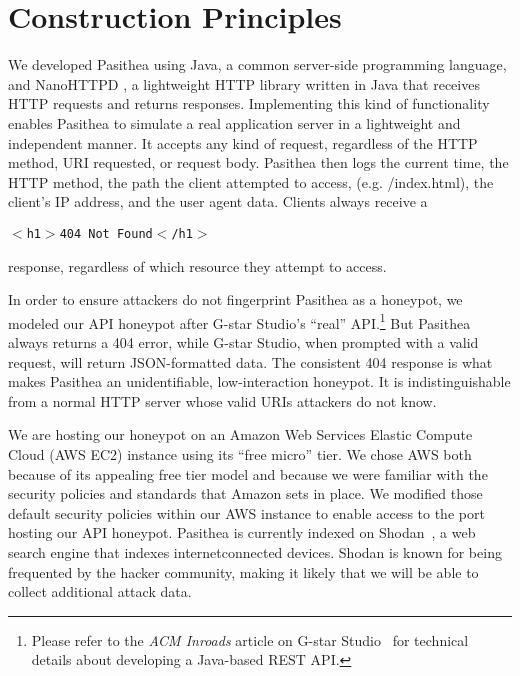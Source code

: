 
\section{Construction Principles} \label{construction}

We developed Pasithea using Java, a common server-side programming language, and NanoHTTPD \cite{Nanohttpd}, a lightweight HTTP library written in Java that receives HTTP requests and returns responses.
Implementing this kind of functionality enables Pasithea to simulate a real application server in a lightweight and independent manner. 
It accepts any kind of request, regardless of the HTTP method, URI requested, or request body. 
Pasithea then logs the current time, the HTTP method, the path the client attempted to access, (e.g. /index.html), the client's IP address, and the user agent data. 
Clients always receive a
 

\begin{center}  %
\texttt{$<$h1$>$404 Not Found$<$/h1$>$ }
\end{center}

\noindent
response, regardless of which resource they attempt to access.

In order to ensure attackers do not fingerprint Pasithea as a honeypot, we modeled our API honeypot after G-star Studio's ``real'' API.\footnote{
Please refer to the {\em ACM Inroads} article on G-star Studio~\cite{inroads-Labouseur16} for technical details about developing a Java-based REST API.
} 
But Pasithea always returns a 404 error, while G-star Studio, when prompted with a valid request, will return JSON-formatted data. 
The consistent 404 response is what makes Pasithea an unidentifiable, low-interaction honeypot. 
It is indistinguishable from a normal HTTP server whose valid URIs attackers do not know. 

We are hosting our honeypot on an Amazon Web Services Elastic Compute Cloud (AWS EC2) instance using its ``free micro'' tier. 
We chose AWS both because of its appealing free tier model and because we were familiar with the security policies and standards that Amazon sets in place. 
We modified those default security policies within our AWS instance to enable access to the port hosting our API honeypot. 
Pasithea is currently indexed on Shodan~\cite{unsavoryChar}, a web search engine that indexes internetconnected devices.
Shodan is known for being frequented by the hacker community, making it likely that we will be able to collect additional attack data.
